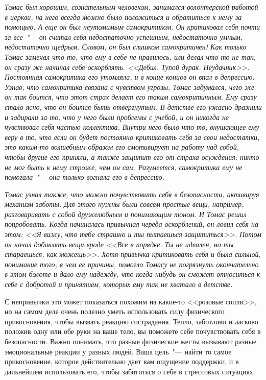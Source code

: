 \vspace{2ex}

\textit{Томас был хорошим, сознательным человеком, занимался волонтерской работой в церкви, на него всегда можно было положиться и обратиться к нему за помощью. А еще он был неутомимым самокритиком. Он критиковал себя почти за все~"--- он считал себя недостаточно успешным, недостаточно умным, недостаточно щедрым. Словом, он был слишком самокритичен! Как только Томас замечал что-то, что ему в себе не нравилось, или делал что-то не так, он сразу же начинал себя оскорблять. <<Дебил. Тупой дурак. Неудачник>>. Постоянная самокритика его утомляла, и в конце концов он впал в депрессию. Узнав, что самокритика связана с чувством угрозы, Томас задумался, чего же он так боится, что этот страх делает его таким самокритичным. Ему сразу стало ясно, что он боится быть отвергнутым. В детстве его ужасно дразнили и задирали за то, что у него были проблемы с учебой, и он никогда не чувствовал себя частью коллектива. Внутри него было что-то, внушающее ему веру в то, что если он будет постоянно критиковать себя за свои недостатки, это каким-то волшебным образом его смотивирует на работу над собой, чтобы другие его приняли, а также защитит его от страха осуждения: никто не мог быть к нему строже, чем он сам. Разумеется, самокритика ему не помогала~"--- она только вогнала его в депрессию.}
 
\textit{Томас узнал также, что можно почувствовать себя в безопасности, активируя механизм заботы. Для этого нужны были совсем простые вещи, например, разговаривать с собой дружелюбным и понимающим тоном. И Томас решил попробовать. Когда начиналась привычная череда оскорблений, он ловил себя на этом: <<Я вижу, что тебе страшно и ты пытаешься защититься>>. Потом он начал добавлять вещи вроде <<Все в порядке. Ты не идеален, но ты стараешься, как можешь>>. Хотя привычка критиковать себя и была сильной, понимание того, в чем ее причины, помогло Томасу не погрязнуть окончательно в этом болоте и дало ему надежду, что когда-нибудь он сможет относиться к себе с добротой и принятием, которых ему так не хватало в детстве.}


С непривычки это может показаться похожим на какие-то <<розовые сопли>>, но на самом деле очень полезно уметь использовать силу физического прикосновения, чтобы вызвать реакцию сострадания. Тепло, заботливо и ласково положив одну или обе руки на ваше тело, вы поможете себе почувствовать себя в безопасности. Важно понимать, что разные физические жесты вызывают разные эмоциональные реакции у разных людей. Ваша цель~"--- найти то самое прикосновение, которое действительно дает вам ощущение поддержки, и в дальнейшем использовать его, чтобы заботиться о себе в стрессовых ситуациях. 

